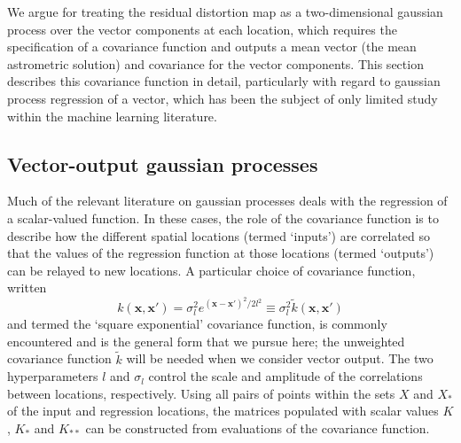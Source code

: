 \documentclass[manuscript]{aastex}
\begin{document}
We argue for treating the residual distortion map as a two-dimensional gaussian process over the vector components at each location, which requires the specification of a covariance function and outputs a mean vector (the mean astrometric solution) and covariance for the vector components. This section describes this covariance function in detail, particularly with regard to gaussian process regression of a vector, which has been the subject of only limited study within the machine learning literature. 

\subsection{Vector-output gaussian processes}
Much of the relevant literature on gaussian processes deals with the regression of a scalar-valued function. In these cases, the role of the covariance function is to describe how the different spatial locations (termed `inputs') are correlated so that the values of the regression function at those locations (termed `outputs') can be relayed to new locations. A particular choice of covariance function, written
\begin{equation}
k(\mathbf{x},\mathbf{x}') = \sigma_l^2 e^{(\mathbf{x}-\mathbf{x}')^2/2l^2} \equiv \sigma_l^2 \tilde{k}(\mathbf{x},\mathbf{x}')
\end{equation}
and termed the `square exponential' covariance function, is commonly encountered and is the general form that we pursue here; the unweighted covariance function $\tilde{k}$ will be needed when we consider vector output.  The two hyperparameters $l$ and $\sigma_l$ control the scale and amplitude of the correlations between locations, respectively. Using all pairs of points within the sets $X$ and $X_\ast$ of the input and regression locations, the matrices populated with scalar values $K$, $K_\ast$ and $K_{\ast\ast}$ can be constructed from evaluations of the covariance function.
\end{document}

